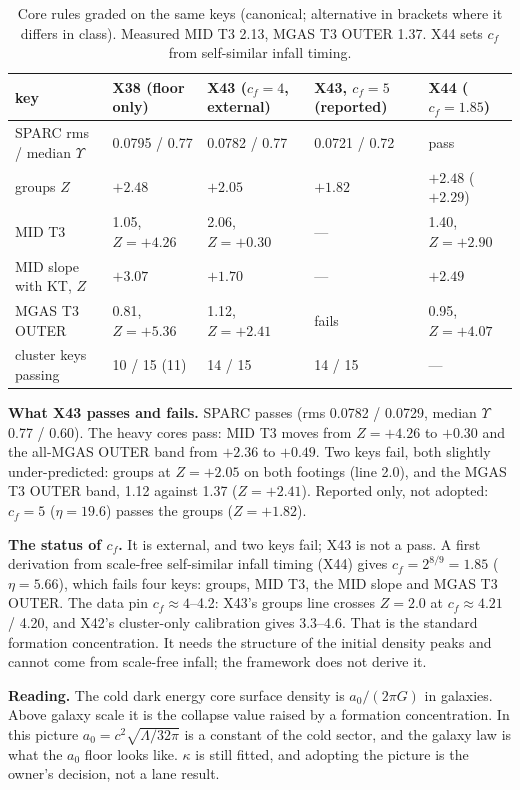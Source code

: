 \documentclass[10pt]{article}
\begin{document}
\begin{table}[h]\centering\small
\caption{Core rules graded on the same keys (canonical; alternative in brackets where it differs in class). Measured MID T3 2.13, MGAS T3 OUTER 1.37. X44 sets $c_f$ from self-similar infall timing.}\label{tab:core}
\begin{tabular}{lllll}
\toprule
key & X38 (floor only) & X43 ($c_f=4$, external) & X43, $c_f=5$ (reported) & X44 ($c_f=1.85$)\\
\midrule
SPARC rms / median $\Upsilon$ & 0.0795 / 0.77 & 0.0782 / 0.77 & 0.0721 / 0.72 & pass\\
groups $Z$ & $+2.48$ & $+2.05$ & $+1.82$ & $+2.48$ ($+2.29$)\\
MID T3 & 1.05, $Z=+4.26$ & 2.06, $Z=+0.30$ & --- & 1.40, $Z=+2.90$\\
MID slope with KT, $Z$ & $+3.07$ & $+1.70$ & --- & $+2.49$\\
MGAS T3 OUTER & 0.81, $Z=+5.36$ & 1.12, $Z=+2.41$ & fails & 0.95, $Z=+4.07$\\
cluster keys passing & 10 / 15 (11) & 14 / 15 & 14 / 15 & ---\\
\bottomrule
\end{tabular}
\end{table}

\textbf{What X43 passes and fails.} SPARC passes (rms 0.0782 / 0.0729, median $\Upsilon$ 0.77 / 0.60). The heavy cores pass: MID T3 moves from $Z=+4.26$ to $+0.30$ and the all-MGAS OUTER band from $+2.36$ to $+0.49$. Two keys fail, both slightly under-predicted: groups at $Z=+2.05$ on both footings (line 2.0), and the MGAS T3 OUTER band, 1.12 against 1.37 ($Z=+2.41$). Reported only, not adopted: $c_f=5$ ($\eta=19.6$) passes the groups ($Z=+1.82$).

\textbf{The status of $c_f$.} It is external, and two keys fail; X43 is not a pass. A first derivation from scale-free self-similar infall timing (X44) gives $c_f=2^{8/9}=1.85$ ($\eta=5.66$), which fails four keys: groups, MID T3, the MID slope and MGAS T3 OUTER. The data pin $c_f\approx4$--4.2: X43's groups line crosses $Z=2.0$ at $c_f\approx4.21$ / 4.20, and X42's cluster-only calibration gives 3.3--4.6. That is the standard formation concentration. It needs the structure of the initial density peaks and cannot come from scale-free infall; the framework does not derive it.

\textbf{Reading.} The cold dark energy core surface density is $a_0/(2\pi G)$ in galaxies. Above galaxy scale it is the collapse value raised by a formation concentration. In this picture $a_0=c^2\sqrt{\Lambda/32\pi}$ is a constant of the cold sector, and the galaxy law is what the $a_0$ floor looks like. $\kappa$ is still fitted, and adopting the picture is the owner's decision, not a lane result.
\end{document}
